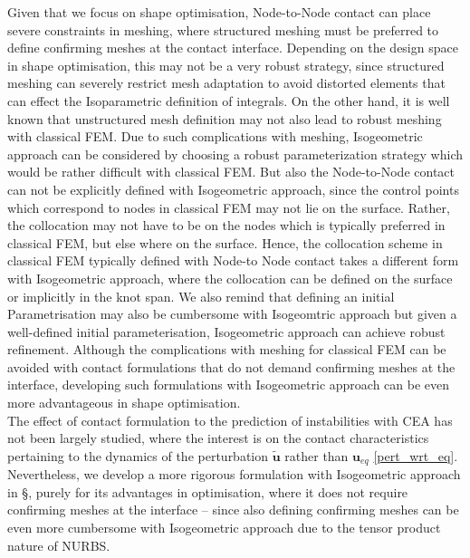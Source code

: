 Given that we focus on shape optimisation, Node-to-Node contact can place severe constraints in meshing, where structured meshing must be preferred to define confirming meshes at the contact interface. Depending on the design space in shape optimisation, this may not be a very robust strategy, since structured meshing can severely restrict mesh adaptation to avoid distorted elements that can effect the Isoparametric definition of integrals. 
On the other hand, it is well known that unstructured mesh definition may not also lead to robust meshing with classical FEM. 
Due to such complications with meshing, Isogeometric approach can be considered by choosing a robust parameterization strategy which would be rather difficult with classical FEM. 
But also the Node-to-Node contact can not be explicitly defined with Isogeometric approach, since the control points which correspond to nodes in classical FEM may not lie on the surface. 
Rather, the collocation may not have to be on the nodes which is typically preferred in classical FEM, but else where on the surface. 
Hence, the collocation scheme in classical FEM typically defined with Node-to Node contact takes a different form with Isogeometric approach, where the collocation can be defined on the surface or implicitly in the knot span.
We also remind that defining an initial Parametrisation may also be cumbersome with Isogeomtric approach but given a well-defined initial parameterisation, Isogeometric approach can achieve robust refinement.
Although the complications with meshing for classical FEM can be avoided with contact formulations that do not demand confirming meshes at the interface, developing such formulations with Isogeometric approach can be even more advantageous in shape optimisation.\\ 

The effect of contact formulation to the prediction of instabilities with CEA has not been largely studied, where the interest is on the contact characteristics pertaining to the dynamics of the perturbation $\bm{\widetilde{u}}$ rather than $\bm{u}_{eq}$ \eqref{pert_wrt_eq}. 
Nevertheless, we develop a more rigorous formulation with Isogeometric approach in {\color{red} \S}, purely for its advantages in optimisation, where it does not require confirming meshes at the interface -- since also defining confirming meshes can be even more cumbersome with Isogeometric approach due to the tensor product nature of NURBS.\\

